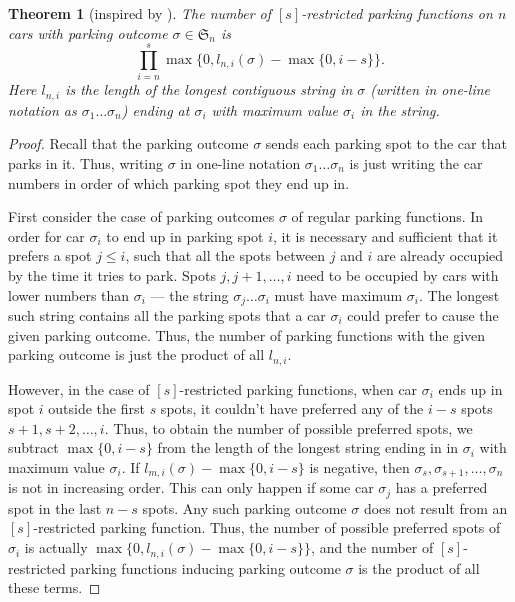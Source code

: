 \documentclass[12 pt]{amsart}
\newtheorem{theorem}{Theorem}[section]
\theoremstyle{definition} %
\theoremstyle{remark} %
\begin{document}
\begin{theorem}[inspired by \cite{pinsky-2024}]
    The number of $[s]$-restricted parking functions on $n$ cars with parking outcome $\sigma \in \mathfrak{S}_n$ is
    \[
    \prod_{i = n}^s \max \{ 0, l_{n,i}(\sigma)-\max \{ 0, i - s \} \}.
    \]
    Here $l_{n, i}$ is the length of the longest contiguous string in $\sigma$ (written in one-line notation as $\sigma_{1} \dots \sigma_{n}$) ending at $\sigma_i$ with maximum value $\sigma_i$ in the string.
\end{theorem}

\begin{proof}
	Recall that the parking outcome $\sigma$ sends each parking spot to the car that parks in it. Thus, writing $\sigma$ in one-line notation $\sigma_{1} \dots \sigma_{n}$ is just writing the car numbers in order of which parking spot they end up in.

	First consider the case of parking outcomes $\sigma$ of regular parking functions. In order for car $\sigma_{i}$ to end up in parking spot $i$, it is necessary and sufficient that it prefers a spot $j \le i$, such that all the spots between $j$ and $i$ are already occupied by the time it tries to park. Spots $j, j + 1, \dots, i$ need to be occupied by cars with lower numbers than $\sigma_{i}$ --- the string $\sigma_{j} \dots \sigma_{i}$ must have maximum $\sigma_{i}$. The longest such string contains all the parking spots that a car $\sigma_{i}$ could prefer to cause the given parking outcome. Thus, the number of parking functions with the given parking outcome is just the product of all $l_{n, i}$.

	However, in the case of $[s]$-restricted parking functions, when car $\sigma_{i}$ ends up in spot $i$ outside the first $s$ spots, it couldn't have preferred any of the $i - s$ spots $s + 1, s + 2, \dots, i$. Thus, to obtain the number of possible preferred spots, we subtract $\max \{ 0, i - s \}$ from the length of the longest string ending in in $\sigma_{i}$ with maximum value $\sigma_{i}$. If $l_{m, i}(\sigma) - \max \{ 0, i - s \}$ is negative, then $\sigma_{s}, \sigma_{s + 1}, \dots, \sigma_{n}$ is not in increasing order. This can only happen if some car $\sigma_{j}$ has a preferred spot in the last $n - s$ spots. Any such parking outcome $\sigma$ does not result from an $[s]$-restricted parking function. Thus, the number of possible preferred spots of $\sigma_{i}$ is actually $\max \{ 0, l_{n, i}(\sigma) - \max \{ 0, i - s \} \}$, and the number of $[s]$-restricted parking functions inducing parking outcome $\sigma$ is the product of all these terms.
\end{proof}
 
\end{document}

